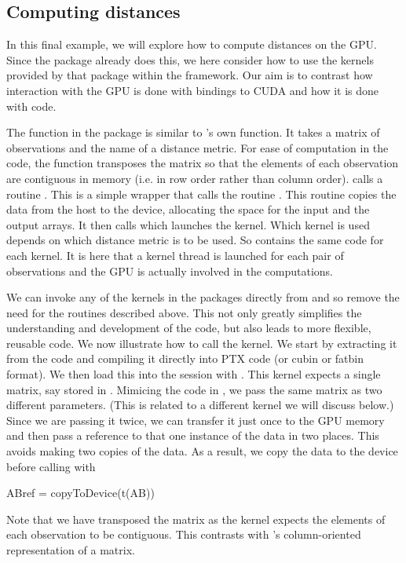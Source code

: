 \subsection{Computing distances}\label{subsec:distances}

In this final example, we will explore how to compute distances on the GPU.
Since the  package already does this, we here consider how
to use the kernels provided by that package within the 
framework. Our aim is to contrast how interaction with the GPU is done
with \R{} bindings to CUDA and how it is done with \C{} code.

The  function in the  package is similar
to \R's own  function.  It takes a matrix of observations
and the name of a distance metric.  For ease of computation in the
\C{} code, the function transposes the matrix so that the elements of
each observation are contiguous in memory (i.e. in row order rather
than column order).   calls a \C{} routine
.  This is a simple wrapper that calls the routine
.  This routine copies the data from the host to the
device, allocating the space for the input and the output arrays.  It
then calls  which launches the kernel.  Which
kernel is used depends on which distance metric is to be used.  So
 contains the same code for each kernel.  It is
here that a kernel thread is launched for each pair of observations
and the GPU is actually involved in the computations.


We can invoke any of the kernels in the  packages
directly from \R{} and so remove the need for the \C{} routines
described above. This not only greatly simplifies the understanding
and development of the code, but also leads to more flexible, reusable
code.  We now illustrate how to call the 
kernel.  We start by extracting it from the \C{} code and compiling it
directly into PTX code (or cubin or fatbin format).  We then load this
into the \R{} session with .
This kernel expects a single matrix, say stored in .
Mimicing the \C{} code in , we pass the same
matrix as two different parameters. (This is related to a different
kernel we will  discuss below.)
Since we are passing it twice, we can transfer it just once to the GPU
memory and then pass a reference to that one instance of the data
in two places. This avoids making two copies of the data.
As a result, we copy the data to the device before calling
 with
\begin{RCode}
ABref = copyToDevice(t(AB))
\end{RCode}
Note that we have transposed the matrix as the kernel
expects the elements of each observation to be contiguous.
This contrasts with \R's column-oriented representation of a matrix.

